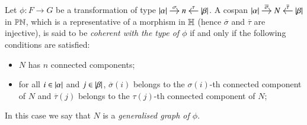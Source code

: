 \begin{definition}\label{definition: generalised graph of transformation}
    Let $\phi \colon F \to G$ be a transformation of type
    $
    \begin{tikzcd}[cramped,sep=small]
    \length\alpha \ar[r,"\sigma"] & n & \length\beta \ar[l,"\tau"']
    \end{tikzcd}
    $.
    A cospan  
    $
    \begin{tikzcd}[cramped,sep=small]
    \length\alpha \ar[r,"\overline\sigma"] & N & \length\beta \ar[l,"\overline\tau"']
    \end{tikzcd}
    $ in $\mathbb{PN}$, which is a representative of a morphism in $\mathbb H$  (hence $\overline\sigma$ and $\overline\tau$ are injective),
    is said to be \emph{coherent with the type of $\phi$} if and only if the following conditions are satisfied:
    \begin{itemize}[leftmargin=*]
        \item $N$ has $n$ connected components; %
        \item for all $i \in \lvert \alpha \rvert$ and $j \in \lvert \beta \rvert$, $\overline\sigma(i)$ belongs to the $\sigma(i)$-th connected component of $N$ and $\overline\tau(j)$ belongs to the $\tau(j)$-th connected component of $N$;
    \end{itemize}
    In this case we say that $N$ is a \emph{generalised graph of $\phi$}.
\end{definition}

